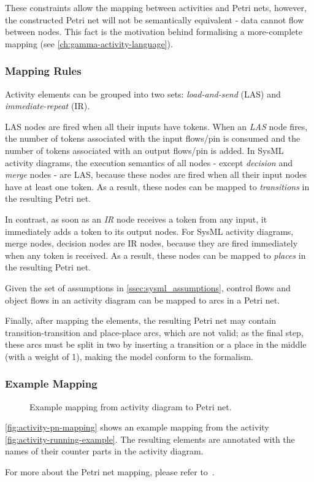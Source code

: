 These constraints allow the mapping between activities and Petri nets, however, the constructed Petri net will not be semantically equivalent - data cannot flow between nodes. This fact is the motivation behind formalising a more-complete mapping (see \autoref{ch:gamma-activity-language}).

\subsubsection*{Mapping Rules}

Activity elements can be grouped into two sets: \emph{load-and-send} (LAS) and \emph{immediate-repeat} (IR).

LAS nodes are fired when all their inputs have tokens. When an \emph{LAS} node fires, the number of tokens associated with the input flows/pin is consumed and the number of tokens associated with an output flows/pin is added. In SysML activity diagrams, the execution semantics of all nodes - except \emph{decision} and \emph{merge} nodes - are LAS, because these nodes are fired when all their input nodes have at least one token. As a result, these nodes can be mapped to \emph{transitions} in the resulting Petri net.

In contrast, as soon as an \emph{IR} node receives a token from any input, it immediately adds a token to its output nodes. For SysML activity diagrams, merge nodes, decision nodes are IR nodes, because they are fired immediately when any token is received. As a result, these nodes can be mapped to \emph{places} in the resulting Petri net.

Given the set of assumptions in \autoref{ssec:sysml_assumptions}, control flows and object flows in an activity diagram can be mapped to arcs in a Petri net.

Finally, after mapping the elements, the resulting Petri net may contain transition-transition and place-place arcs, which are not valid; as the final step, these arcs must be split in two by inserting a transition or a place in the middle (with a weight of 1), making the model conform to the formalism.

\subsubsection*{Example Mapping}

\begin{figure}[!ht]
	\centering
	
	\caption{Example mapping from activity diagram to Petri net.}
	\label{fig:activity-pn-mapping}
\end{figure}

\autoref{fig:activity-pn-mapping} shows an example mapping from the activity \autoref{fig:activity-running-example}. The resulting elements are annotated with the names of their counter parts in the activity diagram.

For more about the Petri net mapping, please refer to~\cite{https://doi.org/10.1002/sys.21524}.